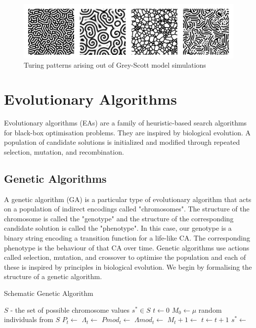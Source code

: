 \begin{figure}[!h]
\centering
\includegraphics[width=\textwidth]{images/turing-patterns.png}
\caption{Turing patterns arising out of Grey-Scott model simulations\cite{sims}}
\label{fig:gs-turing-patterns}
\end{figure}

\section{Evolutionary Algorithms}

Evolutionary algorithms (EAs) are a family of heuristic-based search algorithms for black-box optimisation problems. They are inspired by biological evolution. A population of candidate solutions is initialized and modified through repeated selection, mutation, and recombination.

\subsection{Genetic Algorithms} 

A genetic algorithm (GA) is a particular type of evolutionary algorithm that acts on a population of indirect encodings called "chromosomes". The structure of the chromosome is called the "genotype" and the structure of the corresponding candidate solution is called the "phenotype". In this case, our genotype is a binary string encoding a transition function for a life-like CA. The corresponding phenotype is the behaviour of that CA over time. Genetic algorithms use actions called selection, mutation, and crossover to optimise the population and each of these is inspired by principles in biological evolution. We begin by formalising the structure of a genetic algorithm.\\

\begin{algorithm}
  \caption{Schematic Genetic Algorithm}\label{alg:ea}
  \begin{algorithmic}
  \Require $S$ - the set of possible chromosome values
  \Ensure $s^* \in S$
  \State $t \gets 0$
  \State $M_0 \gets \mu$ random individuals from $S$
    \State {}
    \State $P_t \gets$     
    \State $\Lambda_t \gets$   
    \State $Pmod_t \gets$ 
    \State $\Lambda mod_t \gets$ 
    \State $M_t+1 \gets$ 
    \State $t \gets t+1$
  \EndWhile
  \State $s^* \gets$ 
  \end{algorithmic}
\end{algorithm}

